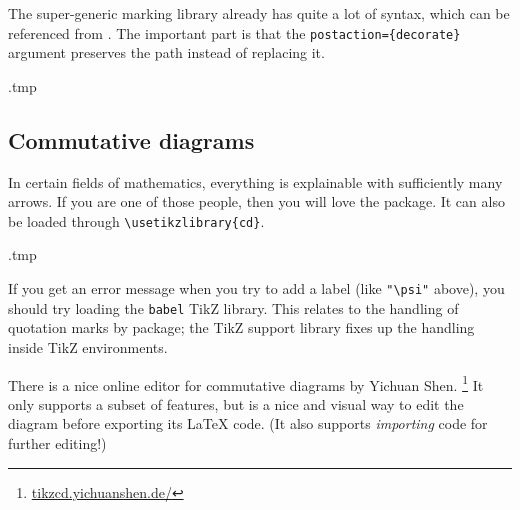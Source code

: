 The super-generic marking library already has quite a lot of syntax,
which can be referenced from \cite[Section~50.6]{tikz}.
The important part is that the \verb|postaction={decorate}|
argument preserves the path instead of replacing it.
%
\begin{VerbatimOut}{\jobname.tmp}
\centering

\end{VerbatimOut}
\ShowExampleBelow[2]




%
\subsection{Commutative diagrams}\label{sec:tikz-cd}

In certain fields of mathematics, everything is explainable with sufficiently many arrows.
If you are one of those people, then you will love the  package.
It can also be loaded through \verb|\usetikzlibrary{cd}|.
%
\begin{VerbatimOut}{\jobname.tmp}
\centering

\end{VerbatimOut}
\ShowExampleBelow[2]

\begin{gotcha}
If you get an error message when you try to add a label (like \verb|"\psi"| above),
you should try loading the \verb|babel| TikZ library.
This relates to the handling of quotation marks by  package;
the TikZ support library fixes up the handling inside TikZ environments.
\end{gotcha}

There is a nice online editor for commutative diagrams by Yichuan Shen.%
\footnote{\url{tikzcd.yichuanshen.de/}}
It only supports a subset of  features,
but is a nice and visual way to edit the diagram before exporting its \LaTeX{} code.
(It also supports \emph{importing} code for further editing!)
